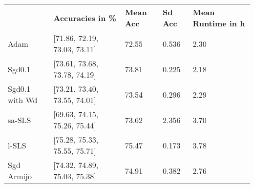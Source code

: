 \begin{tabular}{lllll}
\toprule
{} &               Accuracies in \% & Mean Acc & Sd Acc & Mean Runtime in h \\
\midrule
Adam           &  [71.86, 72.19, 73.03, 73.11] &    72.55 &  0.536 &              2.30 \\
Sgd0.1         &  [73.61, 73.68, 73.78, 74.19] &    73.81 &  0.225 &              2.18 \\
Sgd0.1 with Wd &  [73.21, 73.40, 73.55, 74.01] &    73.54 &  0.296 &              2.29 \\
sa-SLS         &  [69.63, 74.15, 75.26, 75.44] &    73.62 &  2.356 &              3.70 \\
l-SLS          &  [75.28, 75.33, 75.55, 75.71] &    75.47 &  0.173 &              3.78 \\
Sgd Armijo     &  [74.32, 74.89, 75.03, 75.38] &    74.91 &  0.382 &              2.76 \\
\bottomrule
\end{tabular}
